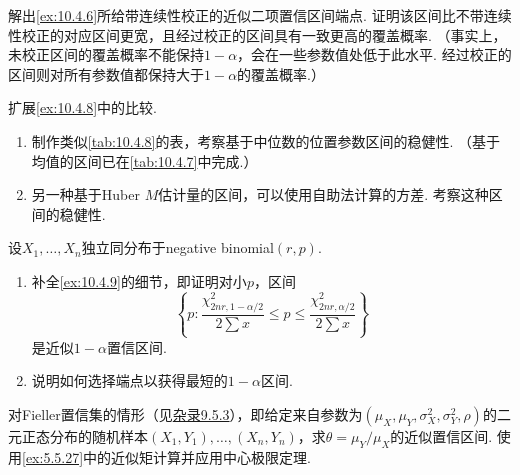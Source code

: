 \begin{exercise}\label{exercise:10.45}
解出\autoref{ex:10.4.6}所给带连续性校正的近似二项置信区间端点. 证明该区间比不带连续性校正的对应区间更宽，且经过校正的区间具有一致更高的覆盖概率. （事实上，未校正区间的覆盖概率不能保持$1-\alpha$，会在一些参数值处低于此水平. 经过校正的区间则对所有参数值都保持大于$1-\alpha$的覆盖概率.）
\end{exercise}

\begin{exercise}\label{exercise:10.46}
扩展\autoref{ex:10.4.8}中的比较.
\begin{enumerate}[label=(\alph*)]
\item 制作类似\autoref{tab:10.4.8}的表，考察基于中位数的位置参数区间的稳健性. （基于均值的区间已在\autoref{tab:10.4.7}中完成.）
\item 另一种基于Huber $M$估计量的区间，可以使用自助法计算的方差. 考察这种区间的稳健性.
\end{enumerate}
\end{exercise}

\begin{exercise}\label{exercise:10.47}
设$X_1,\ldots,X_n$独立同分布于negative binomial$(r,p)$.
\begin{enumerate}[label=(\alph*)]
\item 补全\autoref{ex:10.4.9}的细节，即证明对小$p$，区间
$$\left\{p:\frac{\chi_{2nr,1-\alpha/2}^2}{2\sum x}\leq p\leq\frac{\chi_{2nr,\alpha/2}^2}{2\sum x}\right\}$$
是近似$1-\alpha$置信区间.
\item 说明如何选择端点以获得最短的$1-\alpha$区间.
\end{enumerate}
\end{exercise}

\begin{exercise}\label{exercise:10.48}
对Fieller置信集的情形（见\hyperref[sec:9.5.3]{杂录9.5.3}），即给定来自参数为$(\mu_X,\allowbreak\mu_Y,\allowbreak\sigma_X^2,\allowbreak\sigma_Y^2,\allowbreak\rho)$的二元正态分布的随机样本$(X_1,Y_1),\allowbreak\ldots,\allowbreak(X_n,Y_n)$，求$\theta=\mu_Y/\mu_X$的近似置信区间. 使用\autoref{ex:5.5.27}中的近似矩计算并应用中心极限定理.
\end{exercise}
